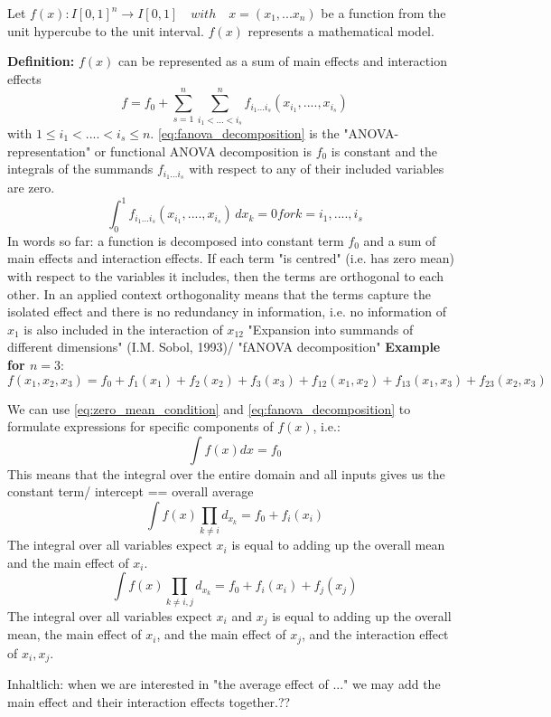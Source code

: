Let $f(x): I[0,1]^n \rightarrow I[0,1] \quad with \quad x = (x_1, ... x_n) $ be a function from the unit hypercube to the unit interval. $f(x)$ represents a mathematical model.\par
\textbf{Definition:} $f(x)$ can be represented as a sum of main effects and interaction effects
\begin{equation}
    f = f_0 + \sum_{s=1}^{n} \sum_{i_1 <...<i_s}^{n} f_{i_{1}...i_{s}} (x_{i_{1}} , ....,x_{i_{s}})
    \label{eq:fanova_decomposition}
\end{equation}
with $1 \leq i_1 < .... < i_s \leq n$.
\autoref{eq:fanova_decomposition} is the "ANOVA-representation" \cite{sobol_global_2001} or functional ANOVA decomposition \cite{hooker_discovering_2004} is $f_0$ is constant and the integrals of the summands $f_{i_{1}...i_{s}}$ with respect to any of their included variables are zero.
\begin{equation}
    \int_{0}^{1} f_{i_{1}...i_{s}} (x_{i_{1}}, ...., x_{i_{s}}) \, dx_k = 0 for k = i_1, ...., i_s
    \label{eq:zero_mean_condition}
\end{equation}
In words so far: a function is decomposed into constant term $f_0$ and a sum of main effects and interaction effects. If each term "is centred" (i.e. has zero mean) with respect to the variables it includes, then the terms are orthogonal to each other. In an applied context orthogonality means that the terms capture the isolated effect and there is no redundancy in information, i.e. no information of $x_1$ is also included in the interaction of $x_12$
"Expansion into summands of different dimensions" (I.M. Sobol, 1993)/ "fANOVA decomposition"\citep{hooker_discovering_2004} 
\textbf{Example for $n=3$}:
\begin{equation}
    f(x_1,x_2,x_3) = f_0 + f_{1}(x_1) + f_{2}(x_2) + f_{3}(x_3) + f_{12}(x_1,x_2) + f_{13}(x_1,x_3) + f_{23}(x_2,x_3)
    \label{eq:fanova_decomposition_example}
\end{equation}

We can use \autoref{eq:zero_mean_condition} and \autoref{eq:fanova_decomposition} to formulate expressions for specific components of $f(x)$, i.e.:
\begin{equation}
    \int f(x) dx = f_0
\end{equation}
This means that the integral over the entire domain and all inputs gives us the constant term/ intercept == overall average
\begin{equation}
    \int f(x) \prod_{k \neq i} d_{x_{k}} = f_0 + f_i(x_i)
\end{equation}
The integral over all variables expect $x_i$ is equal to adding up the overall mean and the main effect of $x_i$.
\begin{equation}
    \int f(x) \prod_{k \neq i,j} d_{x_{k}} = f_0 + f_i(x_i) + f_j(x_j)
\end{equation}
The integral over all variables expect $x_i$ and $x_j$ is equal to adding up the overall mean, the main effect of $x_i$, and the main effect of $x_j$, and the interaction effect of $x_i, x_j$.\par
Inhaltlich: when we are interested in "the average effect of ..." we may add the main effect and their interaction effects together.??




